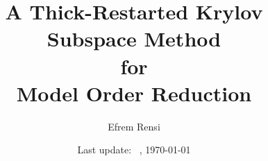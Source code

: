 \documentclass[letterpaper,notitlepage]{report}
\newcommand{\mytitle}{A Thick-Restarted Krylov Subspace Method \\ for \\ Model Order Reduction}
\numberwithin{equation}{chapter}
\begin{document}
 \author{Efrem Rensi}
\title{\mytitle}
\date{Last update: \ \currenttime, \today}

\maketitle
%
\thispagestyle{empty}

\tableofcontents
\clearpage

\linespread{1.5}   %


\clearpage

%



% 





\printindex
\end{document}

